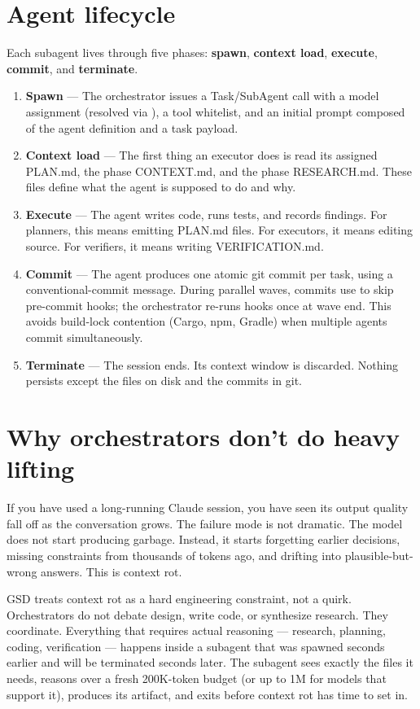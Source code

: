 \documentclass[11pt,letterpaper,openany]{book}
\begin{document}
\section{Agent lifecycle}

Each subagent lives through five phases: \textbf{spawn}, \textbf{context load}, \textbf{execute}, \textbf{commit}, and \textbf{terminate}.

\begin{enumerate}[leftmargin=1.2em]
  \item \textbf{Spawn} — The orchestrator issues a Task/SubAgent call with a model assignment (resolved via ), a tool whitelist, and an initial prompt composed of the agent definition and a task payload.
  \item \textbf{Context load} — The first thing an executor does is read its assigned PLAN.md, the phase CONTEXT.md, and the phase RESEARCH.md. These files define what the agent is supposed to do and why.
  \item \textbf{Execute} — The agent writes code, runs tests, and records findings. For planners, this means emitting PLAN.md files. For executors, it means editing source. For verifiers, it means writing VERIFICATION.md.
  \item \textbf{Commit} — The agent produces one atomic git commit per task, using a conventional-commit message. During parallel waves, commits use  to skip pre-commit hooks; the orchestrator re-runs hooks once at wave end. This avoids build-lock contention (Cargo, npm, Gradle) when multiple agents commit simultaneously.
  \item \textbf{Terminate} — The session ends. Its context window is discarded. Nothing persists except the files on disk and the commits in git.
\end{enumerate}

\section{Why orchestrators don't do heavy lifting}

If you have used a long-running Claude session, you have seen its output quality fall off as the conversation grows. The failure mode is not dramatic. The model does not start producing garbage. Instead, it starts forgetting earlier decisions, missing constraints from thousands of tokens ago, and drifting into plausible-but-wrong answers. This is context rot.

GSD treats context rot as a hard engineering constraint, not a quirk. Orchestrators do not debate design, write code, or synthesize research. They coordinate. Everything that requires actual reasoning — research, planning, coding, verification — happens inside a subagent that was spawned seconds earlier and will be terminated seconds later. The subagent sees exactly the files it needs, reasons over a fresh 200K-token budget (or up to 1M for models that support it), produces its artifact, and exits before context rot has time to set in.
\end{document}
